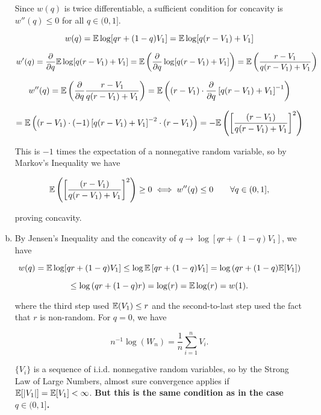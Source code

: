 \begin{solution}
\begin{enumerate}[(a)]
Since \(w(q)\) is twice differentiable, a sufficient condition for concavity is \(w''(q) \leq 0 \) for all \(q \in (0,1]\). 

\[
w(q) =  \mathbb{E} \log[qr + (1-q)V_1] =  \mathbb{E} \log[q(r - V_1) + V_1] 
\]

\begin{equation}\label{2016.screen.1.c.deriv}
w'(q) = \frac{\partial }{\partial q}  \mathbb{E} \log[q(r - V_1) + V_1]  = \mathbb{E}  \left( \frac{\partial }{\partial q} \log[q(r - V_1) + V_1] \right) = \mathbb{E}  \left( \frac{r - V_1}{q(r - V_1) + V_1} \right)
\end{equation}

\[
w''(q) =   \mathbb{E}  \left(   \frac{\partial }{\partial q}\frac{r - V_1}{q(r - V_1) + V_1} \right) =   \mathbb{E}  \left( (r - V_1) \cdot   \frac{\partial }{\partial q} \left[ q(r - V_1) + V_1 \right]^{-1} \right)
\]

\begin{equation}\label{2016.screen.1.c.2nd.deriv}
 =  \mathbb{E}  \left( (r - V_1) \cdot  (-1) \left[ q(r - V_1) + V_1 \right]^{-2} \cdot (r - V_1) \right) = - \mathbb{E} \left(\left[   \frac{(r - V_1)}{q(r-V_1) + V_1} \right]^2 \right)
\end{equation}

This is \(-1\) times the expectation of a nonnegative random variable, so by Markov's Inequality we have 

\[
\mathbb{E} \left(\left[   \frac{(r - V_1)}{q(r-V_1) + V_1} \right]^2 \right) \geq 0 \iff w''(q) \leq 0 \qquad \forall q \in (0,1],
\]

proving concavity.

\item

By Jensen's Inequality and the concavity of \(q \to \log[qr + (1-q)V_1]\), we have

\[
w(q) =  \mathbb{E} \log[qr + (1-q)V_1] \leq \log \mathbb{E} \left[qr + (1-q)V_1 \right] = \log \left( qr + (1-q) \mathbb{E}[V_1] \right) 
\]

\[
\leq  \log \left( qr + (1-q) r \right) = \log(r) =  \mathbb{E} \log(r ) = w(1).
\]

where the third step used \(\mathbb{E}(V_1) \leq r\) and the second-to-last step used the fact that \(r\) is non-random. For \(q=0\), we have

\[
n^{-1} \log (W_n) = \frac{1}{n} \sum_{i=1}^n V_i .
\]

\( \{V_i \}\) is a sequence of i.i.d. nonnegative random variables, so by the Strong Law of Large Numbers, almost sure convergence applies if \( \mathbb{E}[ \left| V_1 \right|] = \mathbb{E}[V_1]   < \infty \). \textbf{But this is the same condition as in the case \(q \in (0, 1]\).}


\end{enumerate}
\end{solution}
